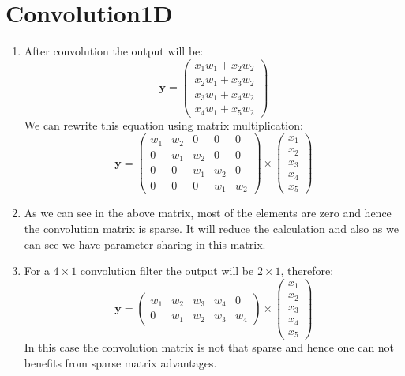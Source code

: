 \documentclass[12]{article}
\begin{document}
	\pagebreak
	\section{Convolution1D}
	\begin{enumerate}[label=\textbf{(\alph*)}]
		\item
		After convolution the output will be:
		\[
		\bm{y} = \left(\begin{matrix}
			x_1 w_1 + x_2 w_2 \\
			x_2 w_1 + x_3 w_2 \\
			x_3 w_1 + x_4 w_2 \\
			x_4 w_1 + x_5 w_2
		\end{matrix}\right)
		\]
		We can rewrite this equation using matrix multiplication:
		\[
		\bm{y} = \left(\begin{matrix}
			w_1 & w_2 &  0 & 0 & 0\\
			0 & w_1 & w_2 & 0 & 0 \\
			0 & 0 & w_1 & w_2 & 0\\
			0 & 0 & 0 & w_1 & w_2
		\end{matrix}\right) \times \left(\begin{matrix}
			x_1 \\ x_2 \\ x_3 \\ x_4 \\ x_5
		\end{matrix}\right)
		\]
		\item
		As we can see in the above matrix, most of the elements are zero and hence the convolution matrix is sparse. It will reduce the calculation and also as we can see we have parameter sharing in this matrix.
		\item
		For a $4\times 1$ convolution filter the output will be $2\times 1$, therefore:
		\[
		\bm{y} = \left(\begin{matrix}
			w_1 & w_2 & w_3 & w_4 & 0 \\
			0 & w_1 & w_2 & w_3 & w_4
		\end{matrix}\right) \times \left(\begin{matrix}
			x_1 \\ x_2 \\ x_3 \\ x_4 \\ x_5
		\end{matrix}\right)
		\]
		In this case the convolution matrix is not that sparse and hence one can not benefits from sparse matrix advantages.
	\end{enumerate}
	
\end{document}
